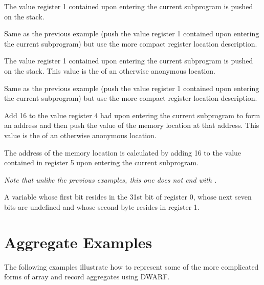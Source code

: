 \begin{description}
\bb
{}
The value register 1 contained upon entering the current subprogram is 
pushed on the stack.
\eb

\descriptionitemnl{\DWOPentryvalue{} 1 \DWOPregone{} }
\bb
Same as the previous example
(push the value register 1 contained upon entering the current subprogram)
but use the more compact register location description.
\eb

\bb
\descriptionitemnl{\DWOPentryvalue{} 2 \DWOPbregone{} 0 \DWOPstackvalue }
\eb
The value register 1 contained upon entering the current subprogram is 
pushed on the stack. This value is the
 of an otherwise anonymous location.

\bb
\descriptionitemnl{\DWOPentryvalue{} 1 \DWOPregone{} \DWOPstackvalue }
Same as the previous example (push the value register 1 contained
upon entering the current subprogram) but use the more compact
register location description.
\eb

\descriptionitemnl{\DWOPentryvalue{} 3 \DWOPbregfour{} 16 \DWOPderef{} \DWOPstackvalue }
Add 16 to the value register 4 had upon entering the current subprogram
to form an address and then push the value of the memory location at that address.
This value is the  of an otherwise anonymous location.

The address of the memory location is calculated by adding 16 to the value
contained in register 5 upon entering the current subprogram.

\textit{Note that unlike the previous \DWOPentryvalue{} examples, this one does not end
with \DWOPstackvalue.{}}

\bb
{}
\vspace{-1\parsep}
A variable whose first bit resides in the 31st bit of register 0, whose next 
seven bits are undefined and whose second byte resides in register 1.
\eb
\end{description}

\section{Aggregate Examples}
\label{app:aggregateexamples}

The following examples illustrate how to represent some of
the more complicated forms of array and record aggregates
using DWARF.

